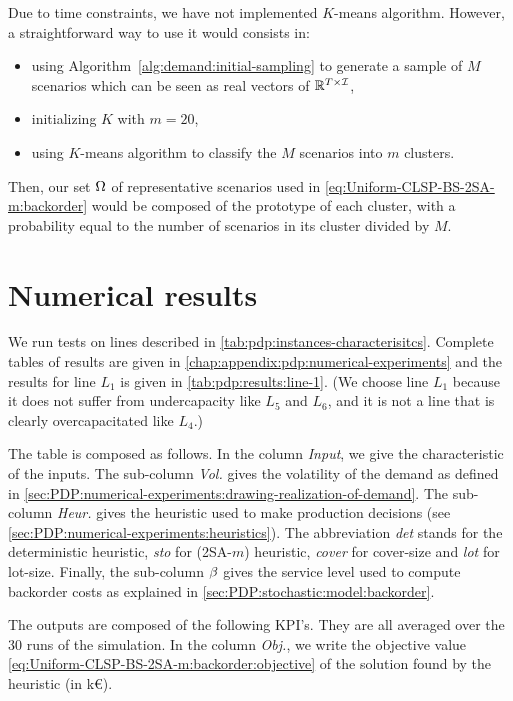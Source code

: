 Due to time constraints, we have not implemented $K$-means algorithm.
However, a straightforward way to use it would consists in:
\begin{itemize}
  \item using Algorithm~\ref{alg:demand:initial-sampling} to generate a sample of $M$ scenarios which can be seen as real vectors of $\mathbb{R}^{T\times\mathcal{I}}$,
  \item initializing $K$ with $m=20$,
  \item using $K$-means algorithm to classify the $M$ scenarios into $m$ clusters.
\end{itemize}
Then, our set $\Omega$ of representative scenarios used in \cref{eq:Uniform-CLSP-BS-2SA-m:backorder} would be composed of the prototype of each cluster, with a probability equal to the number of scenarios in its cluster divided by $M$.


\section{Numerical results}
\label{sec:PDP:numerical-experiments:numerical-results}


We run tests on lines described in \cref{tab:pdp:instances-characterisitcs}.
Complete tables of results are given in \cref{chap:appendix:pdp:numerical-experiments} and the results for line $L_1$ is given in \cref{tab:pdp:results:line-1}.
(We choose line $L_1$ because it does not suffer from undercapacity like $L_5$ and $L_6$, and it is not a line that is clearly overcapacitated like $L_4$.)


The table is composed as follows.
In the column \emph{Input}, we give the characteristic of the inputs.
The sub-column \emph{Vol.} gives the volatility of the demand as defined in \cref{sec:PDP:numerical-experiments:drawing-realization-of-demand}.
The sub-column \emph{Heur.} gives the heuristic used to make production decisions (see \cref{sec:PDP:numerical-experiments:heuristics}).
The abbreviation \emph{det} stands for the deterministic heuristic, \emph{sto} for (2SA-$m$) heuristic, \emph{cover} for cover-size and \emph{lot} for lot-size.
Finally, the sub-column \emph{$\beta$} gives the service level used to compute backorder costs as explained in \cref{sec:PDP:stochastic:model:backorder}.


The outputs are composed of the following KPI's.
They are all averaged over the 30 runs of the simulation.
In the column \emph{Obj.}, we write the objective value \eqref{eq:Uniform-CLSP-BS-2SA-m:backorder:objective} of the solution found by the heuristic (in k\euro{}).


